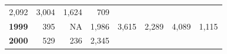 \documentclass[]{article}
\begin{document}
\begin{longtable}[]{@{}rrrrrrrr@{}}
\begin{minipage}[t]{0.14\columnwidth}
2,092\strut
\end{minipage} & \begin{minipage}[t]{0.09\columnwidth}\raggedleft\strut
3,004\strut
\end{minipage} & \begin{minipage}[t]{0.08\columnwidth}\raggedleft\strut
1,624\strut
\end{minipage} & \begin{minipage}[t]{0.10\columnwidth}\raggedleft\strut
709\strut
\end{minipage}\tabularnewline
\begin{minipage}[t]{0.08\columnwidth}\raggedleft\strut
\textbf{1999}\strut
\end{minipage} & \begin{minipage}[t]{0.10\columnwidth}\raggedleft\strut
395\strut
\end{minipage} & \begin{minipage}[t]{0.11\columnwidth}\raggedleft\strut
NA\strut
\end{minipage} & \begin{minipage}[t]{0.08\columnwidth}\raggedleft\strut
1,986\strut
\end{minipage} & \begin{minipage}[t]{0.14\columnwidth}\raggedleft\strut
3,615\strut
\end{minipage} & \begin{minipage}[t]{0.09\columnwidth}\raggedleft\strut
2,289\strut
\end{minipage} & \begin{minipage}[t]{0.08\columnwidth}\raggedleft\strut
4,089\strut
\end{minipage} & \begin{minipage}[t]{0.10\columnwidth}\raggedleft\strut
1,115\strut
\end{minipage}\tabularnewline
\begin{minipage}[t]{0.08\columnwidth}\raggedleft\strut
\textbf{2000}\strut
\end{minipage} & \begin{minipage}[t]{0.10\columnwidth}\raggedleft\strut
529\strut
\end{minipage} & \begin{minipage}[t]{0.11\columnwidth}\raggedleft\strut
236\strut
\end{minipage} & \begin{minipage}[t]{0.08\columnwidth}\raggedleft\strut
2,345\strut
\end{minipage} & \begin{minipage}[t]{0.14\columnwidth}\raggedleft\strut

\end{minipage}
\end{longtable}
\end{document}
